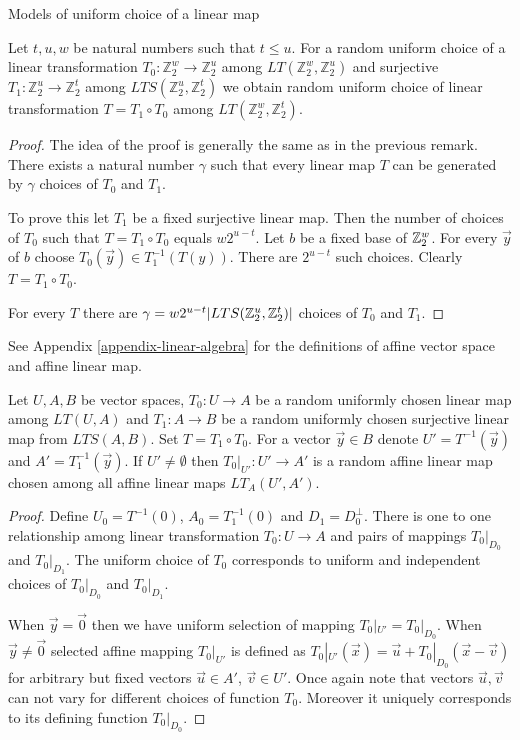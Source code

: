 \begin{section}{Models of uniform choice of a linear map}
\begin{remark}
\label{remark-model-uniform-linear-map-selection}
Let $t, u, w$ be natural numbers such that $t \leq u$. For a random uniform choice of a linear transformation $T_0: \mathbb{Z}_2^w \rightarrow \mathbb{Z}_2^u$ among $LT(\mathbb{Z}_2^w, \mathbb{Z}_2^u)$ and surjective $T_1: \mathbb{Z}_2^u \rightarrow \mathbb{Z}_2^t$ among $LTS(\mathbb{Z}_2^u, \mathbb{Z}_2^t)$ we obtain random uniform choice of linear transformation $T = T_1 \circ T_0$ among $LT(\mathbb{Z}_2^w, \mathbb{Z}_2^t)$.
\end{remark}
\begin{proof}
The idea of the proof is generally the same as in the previous remark. There exists a natural number $\gamma$ such that every linear map $T$ can be generated by $\gamma$ choices of $T_0$ and $T_1$.

To prove this let $T_1$ be a fixed surjective linear map. Then the number of choices of $T_0$ such that $T = T_1 \circ T_0$ equals $w 2 ^ {u - t}$. Let $b$ be a fixed base of  $\mathbb{Z}_{2}^{w}$. For every $\vec{y}$ of $b$ choose $T_0(\vec{y}) \in T_1^{-1}(T(y))$. There are $2^{u - t}$ such choices. Clearly $T = T_1 \circ T_0$.

For every $T$ there are $\gamma = w 2 ^ {u - t} |LTS(\mathbb{Z}_{2}^{u}, \mathbb{Z}_{2}^{t})|$ choices of $T_0$ and $T_1$.
\end{proof}

See Appendix \ref{appendix-linear-algebra} for the definitions of affine vector space and affine linear map.

\begin{remark}
\label{remark-model-uniform-linear-map-selection-affine}
Let $U, A, B$ be vector spaces, $T_0: U \rightarrow A$ be a random uniformly chosen linear map among $LT(U, A)$ and $T_1: A \rightarrow B$ be a random uniformly chosen surjective linear map from $LTS(A, B)$. Set $T = T_1 \circ T_0$. For a vector $\vec{y} \in B$ denote $U' = T^{-1}(\vec{y})$ and $A' = T_1^{-1}(\vec{y})$. If $U' \neq \emptyset$ then $T_0|_{U'}: U' \rightarrow A'$ is a random affine linear map chosen among all affine linear maps $LT_{A}(U', A')$.
\end{remark}
\begin{proof}
Define $U_0 = T^{-1}(0)$, $A_0 = T_1^{-1}(0)$ and $D_1 = D_0 ^ {\bot}$. There is one to one relationship among linear transformation $T_0: U \rightarrow A$ and pairs of mappings $T_0|_{D_0}$ and $T_0|_{D_1}$. The uniform choice of $T_0$ corresponds to uniform and independent choices of $T_0|_{D_0}$ and $T_0|_{D_1}$. 

When $\vec{y} = \vec{0}$ then we have uniform selection of mapping $T_0|_{U'} = T_0|_{D_0}$. When $\vec{y} \neq \vec{0}$ selected affine mapping $T_0|_{U'}$ is defined as $T_0|_{U'}(\vec{x}) = \vec{u} + T_0|_{D_0}(\vec{x} - \vec{v})$ for arbitrary but fixed vectors $\vec{u} \in A'$, $\vec{v} \in U'$. Once again note that vectors $\vec{u}, \vec{v}$ can not vary for different choices of function $T_0$. Moreover it uniquely corresponds to its defining function $T_0|_{D_0}$.
\end{proof}
\end{section}

